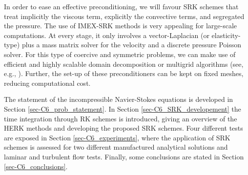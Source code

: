 In order to ease an effective preconditioning, we will favour SRK schemes that treat implicitly the viscous term, explicitly the convective terms, and segregated the pressure. The use of IMEX-SRK methods is very appealing for large-scale computations. At every stage, it only involves a vector-Laplacian (or elasticity-type) plus a mass matrix solver for the velocity and a discrete pressure Poisson solver. For this type of coercive and symmetric problems, we can make use of efficient and highly scalable domain decomposition or multigrid algorithms (see, e.g., \cite{badia_highly_2014}). Further, the set-up of these preconditioners can be kept on fixed meshes, reducing computational cost. 

The statement of the incompressible Navier-Stokes equations is developed in Section \ref{sec-C6_prob_statement}. In Section \ref{sec-C6_SRK_developement} the time integration through RK schemes is introduced, giving an overview of the HERK methods and developing the proposed SRK schemes. Four different tests are exposed in Section \ref{sec-C6_experiments}, where the application of SRK schemes is assessed for two different manufactured analytical solutions and laminar and turbulent flow tests. Finally, some conclusions are stated in Section \ref{sec-C6_conclusions}.


